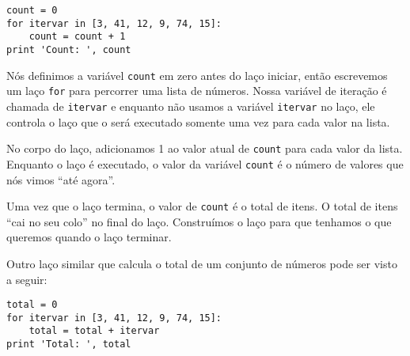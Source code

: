 \beforeverb
\begin{verbatim}
count = 0
for itervar in [3, 41, 12, 9, 74, 15]:
    count = count + 1
print 'Count: ', count
\end{verbatim}
\afterverb
%

%
Nós definimos a variável {\tt count} em zero antes do laço iniciar, então
escrevemos um laço {\tt for} para percorrer uma lista de números. Nossa
variável de iteração é chamada de {\tt itervar} e enquanto não usamos a
variável {\tt itervar} no laço, ele controla o laço que o será executado
somente uma vez para cada valor na lista.


No corpo do laço, adicionamos 1 ao valor atual de {\tt count} para cada valor
da lista. Enquanto o laço é executado, o valor da variável {\tt count} é o
número de valores que nós vimos ``até agora''.


Uma vez que o laço termina, o valor de {\tt count} é o total de itens. O
total de itens ``cai no seu colo'' no final do laço. Construímos o laço para
que tenhamos o que queremos quando o laço terminar.


Outro laço similar que calcula o total de um conjunto de números pode ser
visto a seguir:

\beforeverb
\begin{verbatim}
total = 0
for itervar in [3, 41, 12, 9, 74, 15]:
    total = total + itervar
print 'Total: ', total
\end{verbatim}
\afterverb
%

